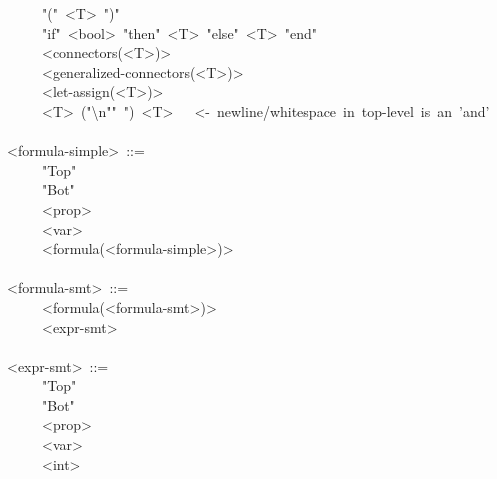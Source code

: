 \begin{mdpre}
~~~~\textbar{}~"("~{\textless{}T\textgreater{}}~")"\\
~~~~\textbar{}~"if"~{\textless{}bool\textgreater{}}~"then"~{\textless{}T\textgreater{}}~"else"~{\textless{}T\textgreater{}}~"end"\\
~~~~\textbar{}~{\textless{}connectors(\textless{}T\textgreater{})\textgreater{}}\\
~~~~\textbar{}~{\textless{}generalized-connectors(\textless{}T\textgreater{})\textgreater{}}\\
~~~~\textbar{}~{\textless{}let-assign(\textless{}T\textgreater{})\textgreater{}}\\
~~~~\textbar{}~{\textless{}T\textgreater{}}~("\textbackslash{}n"\textbar{}"~")~{\textless{}T\textgreater{}}~~~{\textless{}-~newline/whitespace~in~top-level~is~an~'and'}\\
\\
{\textless{}formula-simple\textgreater{}}~::=\\
~~~~\textbar{}~"Top"\\
~~~~\textbar{}~"Bot"\\
~~~~\textbar{}~{\textless{}prop\textgreater{}}\\
~~~~\textbar{}~{\textless{}var\textgreater{}}\\
~~~~\textbar{}~{\textless{}formula(\textless{}formula-simple\textgreater{})\textgreater{}}\\
\\
{\textless{}formula-smt\textgreater{}}~::=\\
~~~~\textbar{}~{\textless{}formula(\textless{}formula-smt\textgreater{})\textgreater{}}\\
~~~~\textbar{}~{\textless{}expr-smt\textgreater{}}\\
\\
{\textless{}expr-smt\textgreater{}}~::=\\
~~~~\textbar{}~"Top"\\
~~~~\textbar{}~"Bot"\\
~~~~\textbar{}~{\textless{}prop\textgreater{}}\\
~~~~\textbar{}~{\textless{}var\textgreater{}}\\
~~~~\textbar{}~{\textless{}int\textgreater{}}\\

\end{mdpre}
